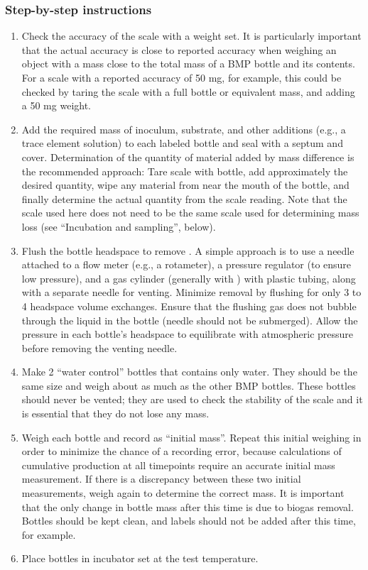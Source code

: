 \documentclass[]{article}
\begin{document}
\subsubsection{Step-by-step instructions}
\begin{enumerate}
    \item Check the accuracy of the scale with a weight set. 
      It is particularly important that the actual accuracy is close to reported accuracy when weighing an object with a mass close to the total mass of a BMP bottle and its contents. 
      For a scale with a reported accuracy of 50 mg, for example, this could be checked by taring the scale with a full bottle or equivalent mass, and adding a 50 mg weight.
    \item Add the required mass of inoculum, substrate, and other additions (e.g., a trace element solution) to each labeled bottle and seal with a septum and cover. 
      Determination of the quantity of material added by mass difference is the recommended approach: Tare scale with bottle, add approximately the desired quantity, wipe any material from near the mouth of the bottle, and finally determine the actual quantity from the scale reading. 
      Note that the scale used here does not need to be the same scale used for determining mass loss (see ``Incubation and sampling'', below).
    \item Flush the bottle headspace to remove . 
      A simple approach is to use a needle attached to a flow meter (e.g., a rotameter), a pressure regulator (to ensure low pressure), and a gas cylinder (generally with ) with plastic tubing, along with a separate needle for venting. 
      Minimize  removal by flushing for only 3 to 4 headspace volume exchanges. 
      Ensure that the flushing gas does not bubble through the liquid in the bottle (needle should not be submerged). 
      Allow the pressure in each bottle’s headspace to equilibrate with atmospheric pressure before removing the venting needle.
    \item Make 2 ``water control'' bottles that contains only water. 
      They should be the same size and weigh about as much as the other BMP bottles. 
      These bottles should never be vented; they are used to check the stability of the scale and it is essential that they do not lose any mass.
    \item Weigh each bottle and record as ``initial mass''. 
      Repeat this initial weighing in order to minimize the chance of a recording error, because calculations of cumulative  production at all timepoints require an accurate initial mass measurement.
      If there is a discrepancy between these two initial measurements, weigh again to determine the correct mass.
      It is important that the only change in bottle mass after this time is due to biogas removal.
      Bottles should be kept clean, and labels should not be added after this time, for example.
    \item Place bottles in incubator set at the test temperature.
\end{enumerate}
\end{document}

